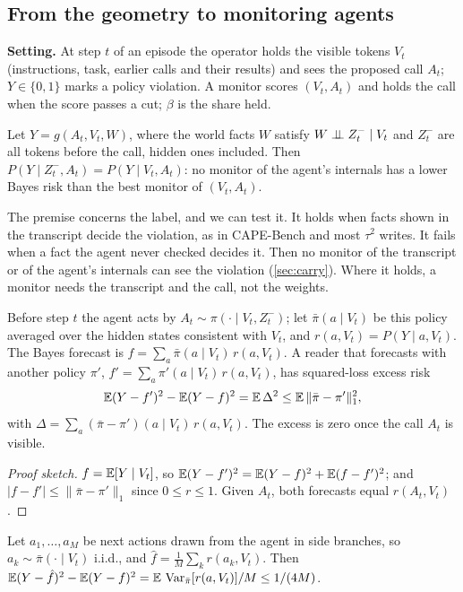 \subsection{From the geometry to monitoring agents}
\label{sec:agents-theory}
\textbf{Setting.} At step $t$ of an episode the operator holds the visible tokens $V_t$ (instructions, task, earlier calls and their results) and sees the proposed call $A_t$; $Y\in\{0,1\}$ marks a policy violation. A monitor scores $(V_t,A_t)$ and holds the call when the score passes a cut; $\beta$ is the share held.
\begin{corollary}\label{cor:action}
Let $Y=g(A_t,V_t,W)$, where the world facts $W$ satisfy $W\perp\!\!\!\perp Z^-_t\mid V_t$ and $Z^-_t$ are all tokens before the call, hidden ones included. Then $P(Y\mid Z^-_t,A_t)=P(Y\mid V_t,A_t)$: no monitor of the agent's internals has a lower Bayes risk than the best monitor of $(V_t,A_t)$.
\end{corollary}
The premise concerns the label, and we can test it. It holds when facts shown in the transcript decide the violation, as in CAPE-Bench and most $\tau^2$ writes. It fails when a fact the agent never checked decides it. Then no monitor of the transcript or of the agent's internals can see the violation (\cref{sec:carry}). Where it holds, a monitor needs the transcript and the call, not the weights.
\begin{proposition}\label{prop:selfforecast}
Before step $t$ the agent acts by $A_t\sim\pi(\cdot\mid V_t,Z^-_t)$; let $\bar\pi(a\mid V_t)$ be this policy averaged over the hidden states consistent with $V_t$, and $r(a,V_t)=P(Y\mid a,V_t)$. The Bayes forecast is $f=\sum_a\bar\pi(a\mid V_t)\,r(a,V_t)$. A reader that forecasts with another policy $\pi'$, $f'=\sum_a\pi'(a\mid V_t)\,r(a,V_t)$, has squared-loss excess risk
\[ \mathbb{E}(Y-f')^2-\mathbb{E}(Y-f)^2=\mathbb{E}\,\Delta^2\le\mathbb{E}\,\|\bar\pi-\pi'\|_1^2, \]
with $\Delta=\sum_a(\bar\pi-\pi')(a\mid V_t)\,r(a,V_t)$. The excess is zero once the call $A_t$ is visible.
\end{proposition}
\begin{proof}[Proof sketch]
$f=\mathbb{E}[Y\mid V_t]$, so $\mathbb{E}(Y-f')^2=\mathbb{E}(Y-f)^2+\mathbb{E}(f-f')^2$; and $|f-f'|\le\|\bar\pi-\pi'\|_1$ since $0\le r\le1$. Given $A_t$, both forecasts equal $r(A_t,V_t)$.
\end{proof}
\begin{corollary}\label{cor:rollout}
Let $a_1,\dots,a_M$ be next actions drawn from the agent in side branches, so $a_k\sim\bar\pi(\cdot\mid V_t)$ i.i.d., and $\hat f=\frac1M\sum_k r(a_k,V_t)$. Then $\mathbb{E}(Y-\hat f)^2-\mathbb{E}(Y-f)^2=\mathbb{E}\,\operatorname{Var}_{\bar\pi}[r(a,V_t)]/M\le 1/(4M)$.
\end{corollary}
